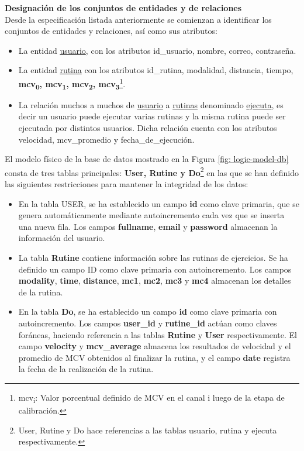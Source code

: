\textbf{Designación de los conjuntos de entidades y de relaciones}\\
Desde la especificación listada anteriormente se comienzan a
identificar los conjuntos de entidades y relaciones, así como sus atributos:
\begin{itemize}
    \item La entidad \underline{usuario}, con los atributos id\_usuario, nombre, correo, contraseña.
    \item La entidad \underline{rutina} con los atributos id\_rutina, modalidad, distancia, tiempo, \textbf{mcv\textsubscript{0}, mcv\textsubscript{1}, mcv\textsubscript{2}, mcv\textsubscript{3}}\footnote{mcv\textsubscript{i}: Valor porcentual definido de MCV en el canal i luego de la etapa de calibración.}.
    \item La relación muchos a muchos de \underline{usuario} a \underline{rutinas} denominado \underline{ejecuta}, es decir un usuario puede ejecutar 
    varias rutinas y la misma rutina puede ser ejecutada por distintos usuarios. Dicha relación cuenta con los atributos velocidad, mcv\_promedio y fecha\_de\_ejecución. 
\end{itemize}
    
El modelo físico de la base de datos mostrado en la Figura \ref{fig: logic-model-db} consta de tres tablas principales: \textbf{User, Rutine y Do}\footnote{User, Rutine y Do hace referencias a las tablas usuario, rutina y ejecuta respectivamente.} en las que se han definido las siguientes restricciones para mantener la integridad de los datos:

\begin{itemize}
    \item En la tabla USER, se ha establecido un campo \textbf{id} como clave primaria, que se genera automáticamente mediante autoincremento cada vez que se inserta una nueva fila. Los campos \textbf{fullname}, \textbf{email} y \textbf{password} almacenan la información del usuario.

    \item La tabla \textbf{Rutine} contiene información sobre las rutinas de ejercicios. Se ha definido un campo ID como clave primaria con autoincremento. Los campos \textbf{modality}, \textbf{time}, \textbf{distance}, \textbf{mc1}, \textbf{mc2}, \textbf{mc3} y \textbf{mc4} almacenan los detalles de la rutina.

    \item En la tabla \textbf{Do}, se ha establecido un campo \textbf{id} como clave primaria con autoincremento. Los campos \textbf{user\_id} y \textbf{rutine\_id} actúan como claves foráneas, haciendo referencia a las tablas \textbf{Rutine} y \textbf{User} respectivamente. El campo \textbf{velocity} y \textbf{mcv\_average} almacena los resultados de velocidad y el promedio de MCV obtenidos al finalizar la rutina, y el campo \textbf{date} registra la fecha de la realización de la rutina.
\end{itemize}

